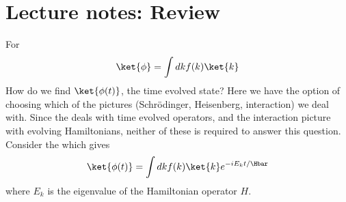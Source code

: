 %
%
\section{Lecture notes: Review}
%
For
\begin{equation}\label{eqn:lecture5BigReviewCh3Dynamical:20}
\ket{\phi} = \int dk f(k) \ket{k}
\end{equation}
%
How do we find \(\ket{\phi(t)}\), the time evolved state?  Here we have the option of choosing which of the pictures (Schr\"{o}dinger, Heisenberg, interaction) we deal with.  Since the  deals with time evolved operators, and the interaction picture with evolving Hamiltonians, neither of these is required to answer this question.  Consider the  which gives
%
\begin{equation}\label{eqn:lecture5BigReviewCh3Dynamical:40}
\ket{\phi(t)} = \int dk f(k) \ket{k} e^{-i E_k t/\Hbar}
\end{equation}
%
where \(E_k\) is the eigenvalue of the Hamiltonian operator \(H\).


